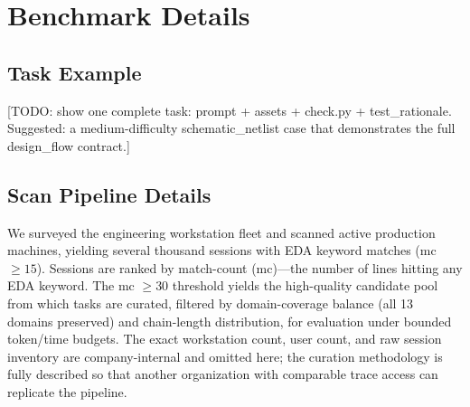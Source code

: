 \section{Benchmark Details}
\label{sec:benchmark-details}


\subsection{Task Example}
\label{sec:task-example}

[TODO: show one complete task: prompt + assets + check.py + test\_rationale. Suggested: a medium-difficulty schematic\_netlist case that demonstrates the full design\_flow contract.]

\subsection{Scan Pipeline Details}
\label{sec:scan-pipeline}

We surveyed the engineering workstation fleet and scanned active production machines, yielding several thousand sessions with EDA keyword matches (mc $\geq 15$). Sessions are ranked by match-count (mc)---the number of lines hitting any EDA keyword. The mc $\geq 30$ threshold yields the high-quality candidate pool from which \Ncases{} tasks are curated, filtered by domain-coverage balance (all 13 domains preserved) and chain-length distribution, for evaluation under bounded token/time budgets. The exact workstation count, user count, and raw session inventory are company-internal and omitted here; the curation methodology is fully described so that another organization with comparable trace access can replicate the pipeline.

